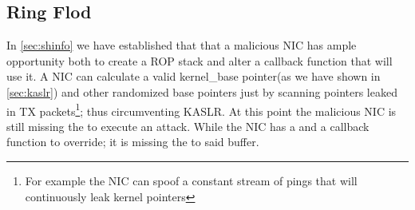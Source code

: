 \subsection{Ring Flod}\label{sec:ringflod}
In \ref{sec:shinfo} we have established that that a malicious NIC has ample opportunity both to create a ROP stack and alter a callback function that will use it. A NIC can calculate a valid kernel\_base pointer(as we have shown in \ref{sec:kaslr}) and other randomized base pointers just by scanning pointers leaked in TX packets\footnote{For example the NIC can spoof a constant stream of pings that will continuously leak kernel pointers}; thus circumventing KASLR. At this point the malicious NIC is still missing the \means to execute an attack.
While the NIC has a \mabaf and a callback function to override; it is missing the \kva to said buffer.

\newline
